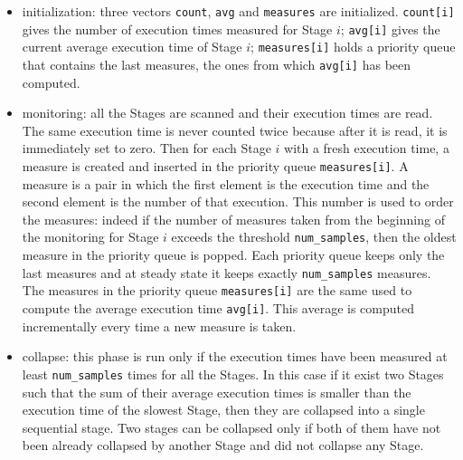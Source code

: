 \documentclass[12pt]{article}
\begin{document}
\begin{itemize}
\item initialization: three vectors \texttt{count}, \texttt{avg} and \texttt{measures} are initialized. \texttt{count[i]} gives the number of execution times measured for Stage $i$; \texttt{avg[i]} gives the current average execution time of Stage $i$; \texttt{measures[i]} holds a priority queue that contains the last measures, the ones from which \texttt{avg[i]} has been computed. 
\item monitoring: all the Stages are scanned and their execution times are read. The same execution time is never counted twice because after it is read, it is immediately set to zero. Then for each Stage $i$ with a fresh execution time, a measure is created and inserted in the priority queue \texttt{measures[i]}. A measure is a pair in which the first element is the execution time and the second element is the number of that execution. This number is used to order the measures: indeed if the number of measures taken from the beginning of the monitoring for Stage $i$ exceeds the threshold \texttt{num\_samples}, then the oldest measure in the priority queue is popped. Each priority queue keeps only the last measures and at steady state it keeps exactly \texttt{num\_samples} measures. The measures in the priority queue \texttt{measures[i]} are the same used to compute the average execution time \texttt{avg[i]}. This average is computed incrementally every time a new measure is taken. 
\item collapse: this phase is run only if the execution times have been measured at least \texttt{num\_samples} times for all the Stages. In this case if it exist two Stages such that the sum of their average execution times is smaller than the execution time of the slowest Stage, then they are collapsed into a single sequential stage. Two stages can be collapsed only if both of them have not been already collapsed by another Stage and did not collapse any Stage.
\end{itemize}
\end{document}
